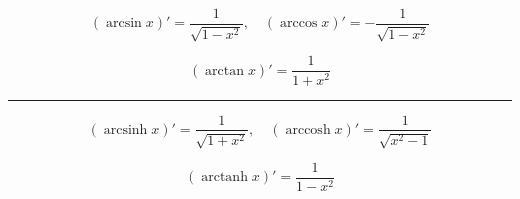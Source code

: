 \documentclass{article}
\DeclareMathOperator{\arcsinh}{arcsinh}
\DeclareMathOperator{\arccosh}{arccosh}
\DeclareMathOperator{\arctanh}{arctanh}
\begin{document}
\begin{multicols}{2}
\begin{equation*}
  (\arcsin x)' = \frac{1}{\sqrt{1 - x^2}}, \quad (\arccos x)' = -\frac{1}{\sqrt{1 - x^2}}
\end{equation*}

\vspace*{0mm}

\begin{equation*}
  (\arctan x)' = \frac{1}{1+x^2}
\end{equation*}

\hrule

\vspace*{2mm}

\begin{equation*}
  (\arcsinh x)' = \frac{1}{\sqrt{1 + x^2}}, \quad (\arccosh x)' = \frac{1}{\sqrt{x^2 - 1}}
\end{equation*}

\vspace*{0mm}

\begin{equation*}
  (\arctanh x)' = \frac{1}{1-x^2}
\end{equation*}


\pagebreak


\end{multicols}
\end{document}
